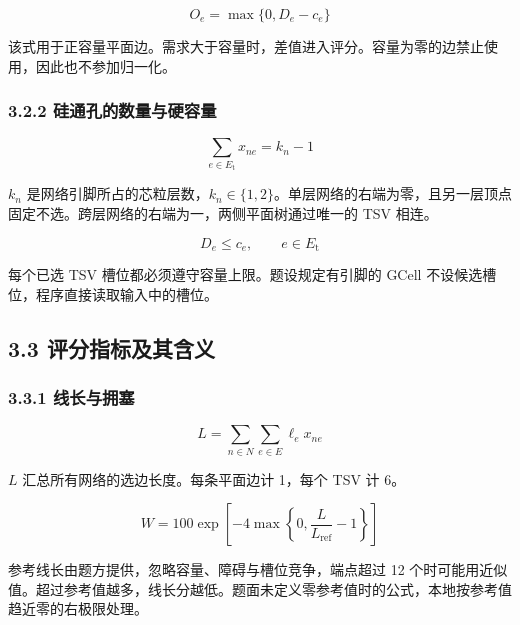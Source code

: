 \documentclass[12pt,a4paper]{article}
\begin{document}
\begin{equation}
O_e=\max\{0,D_e-c_e\}
\label{eq:overflow}
\end{equation}

该式用于正容量平面边。需求大于容量时，差值进入评分。容量为零的边禁止使用，因此也不参加归一化。

\subsubsection{3.2.2
硅通孔的数量与硬容量}\label{ux7845ux901aux5b54ux7684ux6570ux91cfux4e0eux786cux5bb9ux91cf}

\begin{equation}
\sum_{e\in E_{\mathrm t}}x_{ne}=k_n-1
\label{eq:tsv-count}
\end{equation}

\(k_n\)
是网络引脚所占的芯粒层数，$k_n\in\{1,2\}$。单层网络的右端为零，且另一层顶点固定不选。跨层网络的右端为一，两侧平面树通过唯一的
TSV 相连。

\begin{equation}
D_e\le c_e,\qquad e\in E_{\mathrm t}
\label{eq:tsv-cap}
\end{equation}

每个已选 TSV 槽位都必须遵守容量上限。题设规定有引脚的 GCell
不设候选槽位，程序直接读取输入中的槽位。

\subsection{3.3
评分指标及其含义}\label{ux8bc4ux5206ux6307ux6807ux53caux5176ux542bux4e49}

\subsubsection{3.3.1 线长与拥塞}\label{ux7ebfux957fux4e0eux62e5ux585e}

\begin{equation}
L=\sum_{n\in N}\sum_{e\in E}\ell_e x_{ne}
\label{eq:length}
\end{equation}

\(L\) 汇总所有网络的选边长度。每条平面边计 1，每个 TSV 计 6。

\begin{equation}
W=100\exp\left[-4\max\left\{0,\frac{L}{L_{\mathrm{ref}}}-1\right\}\right]
\label{eq:wire}
\end{equation}

参考线长由题方提供，忽略容量、障碍与槽位竞争，端点超过 12
个时可能用近似值。超过参考值越多，线长分越低。题面未定义零参考值时的公式，本地按参考值趋近零的右极限处理。
\end{document}
